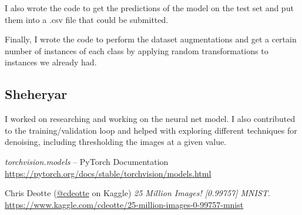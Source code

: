 \documentclass[12pt]{article}
\begin{document}
I also wrote the code to get the predictions of the model on the test set and put them into a .csv file that could be submitted. 

Finally, I wrote the code to perform the dataset augmentations and get a certain number of instances of each class by applying random transformations to instances we already had.

\subsection{Sheheryar}
I worked on researching and working on the neural net model. I also
contributed to the training/validation loop and helped with exploring
different techniques for denoising, including thresholding the images at
a given value.

\begin{thebibliography}{2}
  \textit{torchvision.models} -- PyTorch Documentation
  \\\url{https://pytorch.org/docs/stable/torchvision/models.html}

  Chris Deotte (\href{https://www.kaggle.com/cdeotte}{@cdeotte} on
  Kaggle)
  \textit{25 Million Images! [0.99757] MNIST}.
  \\\url{https://www.kaggle.com/cdeotte/25-million-images-0-99757-mnist}
\end{thebibliography}
\end{document}
